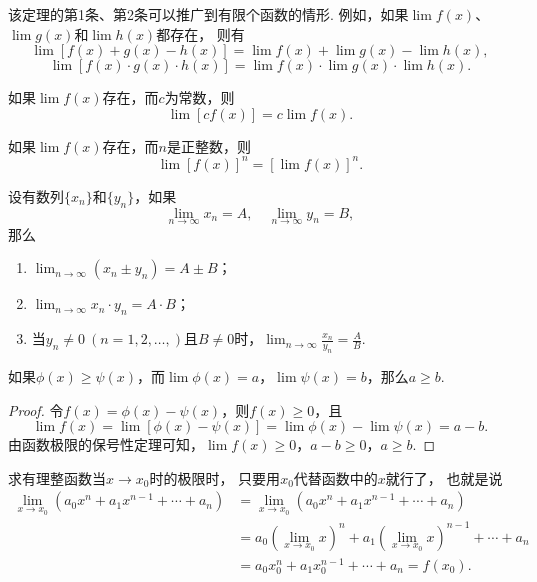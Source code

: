该定理的第1条、第2条可以推广到有限个函数的情形.
例如，如果\(\lim f(x)\)、\(\lim g(x)\)和\(\lim h(x)\)都存在，
则有\[
	\lim[f(x) + g(x) - h(x)] = \lim f(x) + \lim g(x) - \lim h(x),
\]\[
	\lim[f(x) \cdot g(x) \cdot h(x)] = \lim f(x) \cdot \lim g(x) \cdot \lim h(x).
\]

\begin{corollary}
如果\(\lim f(x)\)存在，而\(c\)为常数，则\[\lim [c f(x)] = c \lim f(x).\]
\end{corollary}

\begin{corollary}
如果\(\lim f(x)\)存在，而\(n\)是正整数，则\[\lim [f(x)]^n = [\lim f(x)]^n.\]
\end{corollary}

\begin{theorem}
设有数列\(\{x_n\}\)和\(\{y_n\}\)，如果\[
\lim_{n\to\infty}x_n = A,
\quad
\lim_{n\to\infty}y_n = B,
\]那么\begin{enumerate}
\item \(\lim_{n\to\infty}{(x_n \pm y_n)}=A \pm B\)；
\item \(\lim_{n\to\infty}{x_n \cdot y_n}=A \cdot B\)；
\item 当\(y_n \neq 0\ (n=1,2,\dotsc,)\)且\(B \neq 0\)时，\(\lim_{n\to\infty}{\frac{x_n}{y_n}}=\frac{A}{B}\).
\end{enumerate}
\end{theorem}

\begin{theorem}
如果\(\phi(x) \geq \psi(x)\)，而\(\lim \phi(x)=a\)，\(\lim \psi(x)=b\)，那么\(a \geq b\).
\begin{proof}
令\(f(x) = \phi(x) - \psi(x)\)，则\(f(x) \geq 0\)，且\[
\lim f(x) = \lim[\phi(x) - \psi(x)]
= \lim \phi(x) - \lim \psi(x)
= a - b.
\]由函数极限的保号性定理可知，\(\lim f(x) \geq 0\)，\(a - b \geq 0\)，\(a \geq b\).
\end{proof}
\end{theorem}

\begin{example}\label{example:极限.有理整函数在一点的极限}
求有理整函数当\(x\to x_0\)时的极限时，
只要用\(x_0\)代替函数中的\(x\)就行了，
也就是说
\def\lx{\left(\lim_{x \to x_0} x\right)}
\begin{align*}
	\lim_{x \to x_0} (a_0 x^n + a_1 x^{n-1} + \dotsb + a_n)
	&= \lim_{x \to x_0}{(a_0 x^n + a_1 x^{n-1} + \dotsb + a_n)} \\
	&= a_0 \lx^n + a_1 \lx^{n-1} + \dotsb + a_n \\
	&= a_0 x_0^n + a_1 x_0^{n-1} + \dotsb + a_n
	= f(x_0).
\end{align*}
\end{example}

